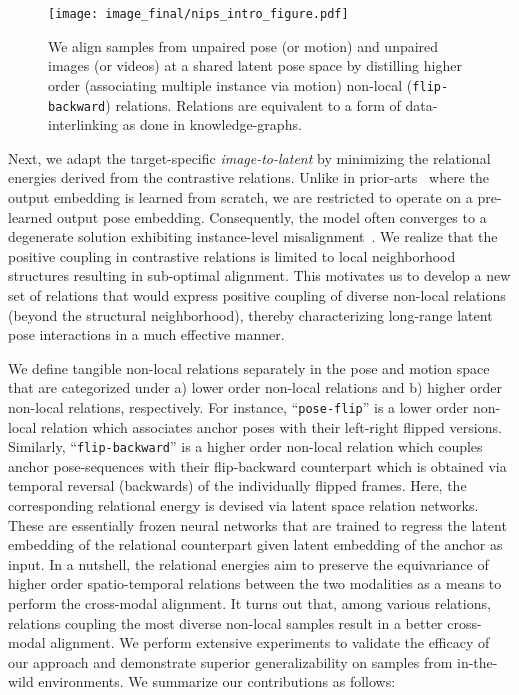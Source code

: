\documentclass{article}
\begin{document}
\begin{wrapfigure}{r}{0.5\textwidth} \begin{center}
\vspace{-7mm}
	\texttt{[image: image\_final/nips\_intro\_figure.pdf]}
	\vspace{-6mm}
	\caption{ \small
	We align samples from unpaired pose (or motion) and unpaired images (or videos) at a shared latent pose space by distilling higher order (associating multiple instance via motion) non-local (\eg \texttt{flip-backward}) relations. Relations are equivalent to a form of data-interlinking as done in knowledge-graphs.
}
    \vspace{-7mm}
    \label{fig:intro_figure}  
\end{center}
\end{wrapfigure}


Next, we adapt the target-specific \textit{image-to-latent} by minimizing the relational energies derived from the contrastive relations. Unlike in prior-arts~\cite{chen2020simple, misra2020self} where the output embedding is learned from scratch, we are restricted to operate on a pre-learned output pose embedding. Consequently, the model often converges to a degenerate solution exhibiting instance-level misalignment~\cite{luo2019taking}. We realize that the positive coupling in contrastive relations is limited to local neighborhood structures resulting in sub-optimal alignment. This motivates us to develop a new set of relations that would express positive coupling of diverse non-local relations (beyond the structural neighborhood), thereby characterizing long-range latent pose interactions in a much effective manner.

We define tangible non-local relations separately in the pose and motion space that are categorized under a) lower order non-local relations and b) higher order non-local relations, respectively. For instance, “\texttt{pose-flip}” is a lower order non-local relation which associates anchor poses with their left-right flipped versions. Similarly, “\texttt{flip-backward}” is a higher order non-local relation which couples anchor pose-sequences with their flip-backward counterpart which is obtained via temporal reversal (backwards) of the individually flipped frames. Here, the corresponding relational energy is devised via latent space relation networks. These are essentially frozen neural networks that are trained to regress the latent embedding of the relational counterpart given latent embedding of the anchor as input. In a nutshell, the relational energies aim to preserve the equivariance of higher order spatio-temporal relations between the two modalities as a means to perform the cross-modal alignment.  It turns out that, among various relations, relations coupling the most diverse non-local samples result in a better cross-modal alignment. We perform extensive experiments to validate the efficacy of our approach and demonstrate superior generalizability on samples from in-the-wild environments. We summarize our contributions as follows:
\end{document}
